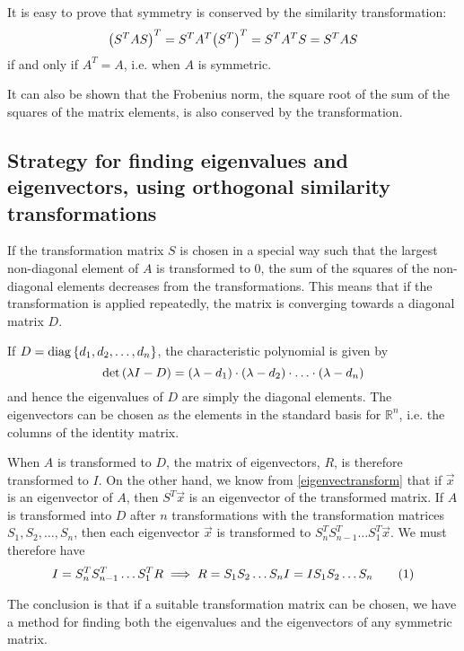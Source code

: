 \documentclass[12pt,english,a4paper]{report}
\newcommand{\R}{\mathbb{R}}
\newcommand{\eqtag}[1]{\refstepcounter{equation}\tag{\theequation}\label{#1}}
\begin{document}
It is easy to prove that symmetry is conserved by the similarity transformation:
\[
\qty(S^TAS)^T = S^TA^T\qty(S^T)^T = S^TA^TS = S^TAS
\]
if and only if \(A^T=A\), i.e. when \(A\) is symmetric.

It can also be shown that the Frobenius norm, the square root of the sum of the squares of the matrix elements, is also conserved by the transformation\autocite{compphys}.

\subsection{Strategy for finding eigenvalues and eigenvectors, using orthogonal similarity transformations}
If the transformation matrix \(S\) is chosen in a special way such that the largest non-diagonal element of \(A\) is transformed to \(0\), the sum of the squares of the non-diagonal elements decreases from the transformations. This means that if the transformation is applied repeatedly, the matrix is converging towards a diagonal matrix \(D\).

If \(D=\operatorname{diag}\qty{d_1,d_2,\dots,d_n}\), the characteristic polynomial is given by
\[
\operatorname{det}\qty(\lambda I - D) = \qty(\lambda-d_1)\cdot\qty(\lambda-d_2)\cdot\ldots\cdot\qty(\lambda-d_n)
\]
and hence the eigenvalues of \(D\) are simply the diagonal elements. The eigenvectors can be chosen as the elements in the standard basis for \(\R^n\), i.e. the columns of the identity matrix.

When \(A\) is transformed to \(D\), the matrix of eigenvectors, \(R\), is therefore transformed to \(I\). On the other hand, we know from \vref{eigenvectransform} that if \(\vec{x}\) is an eigenvector of \(A\), then \(S^T\vec{x}\) is an eigenvector of the transformed matrix. If \(A\) is transformed into \(D\) after \(n\) transformations with the transformation matrices \(S_1,S_2,\dots,S_n\), then each eigenvector \(\vec{x}\) is transformed to \(S_n^TS_{n-1}^T\dots S_1^T\vec{x}\). We must therefore have
\[
I = S_n^TS_{n-1}^T\dots S_1^TR \implies R = S_1S_2\dots S_nI = IS_1S_2\dots S_n \eqtag{findR}
\]

The conclusion is that if a suitable transformation matrix can be chosen, we have a method for finding both the eigenvalues and the eigenvectors of any symmetric matrix.

\end{document}
